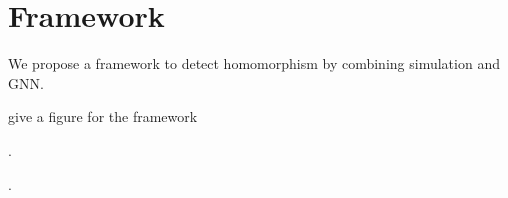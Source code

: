 \section{Framework}
We propose a framework to detect homomorphism
by combining simulation and GNN.

give a figure for the framework

.

.
